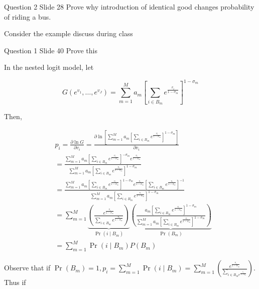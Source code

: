 \documentclass{article}
\begin{document}
\begin{problem}{Question 2 Slide 28}
Prove why introduction of identical good changes probability of riding a bus.
\end{problem}
\begin{solution}
Consider the example discuss during class 
\end{solution}


\begin{problem}{Question 1 Slide 40}
Prove this
\end{problem}
\begin{solution}
In the nested logit model, let

\begin{equation*}
G\left(e^{v_{1}}, \ldots, e^{v_{J}}\right)=\sum_{m=1}^{M} a_{m}\left[\sum_{i \in B_{m}} e^{\frac{v_{i}}{1-\sigma_{m}}}\right]^{1-\sigma_{m}}
\end{equation*}

Then,

\begin{equation*}
\begin{aligned}
& p_{i}=\frac{\partial \ln G}{\partial v_{i}}=\frac{\partial \ln \left[\sum_{m=1}^{M} a_{m}\left[\sum_{i \in B_{m}} e^{\frac{v_{i}}{1-\sigma_{m}}}\right]^{1-\sigma_{m}}\right]}{\partial v_{i}} \\
& =\frac{\sum_{m=1}^{M} a_{m}\left[\sum_{i \in B_{m}} e^{\frac{v_{i}}{1-\sigma_{m}}}\right]^{-\sigma_{m}} e^{\frac{v_{i}}{1-\sigma_{m}}}}{\sum_{m=1}^{M} a_{m}\left[\sum_{i \in B_{m}} e^{\frac{v_{i}}{1-\sigma_{m}}}\right]^{1-\sigma_{m}}} \\
& =\frac{\sum_{m=1}^{M} a_{m}\left[\sum_{i \in B_{m}} e^{\frac{v_{i}}{1-\sigma_{m}}}\right]^{1-\sigma_{m}} e^{\frac{v_{i}}{1-\sigma_{m}}}\left[\sum_{i \in B_{m}} e^{\frac{v_{i}}{1-\sigma_{m}}}\right]^{-1}}{\sum_{m=1}^{M} a_{m}\left[\sum_{i \in B_{m}} e^{\frac{v_{i}}{1-\sigma_{m}}}\right]^{1-\sigma_{m}}} \\
& =\sum_{m=1}^{M} \underbrace{\left(\frac{e^{\frac{v_{i}}{1-\sigma_{m}}}}{\sum_{i \in B_{m}} e^{\frac{v_{i}}{1-\sigma_{m}}}}\right)}_{\Pr\left(i \mid B_{m}\right)} \underbrace{\left(\frac{a_{m}\left[\sum_{i \in B_{m}} e^{\frac{v_{i}}{1-\sigma_{m}}}\right]^{1-\sigma_{m}}}{\sum_{m=1}^{M} a_{m}\left[\sum_{i \in B_{m}} e^{\frac{v_{i}}{1-\sigma_{m}}}\right]^{1-\sigma_{m}}}\right)}_{\Pr\left(B_{m}\right)} \\
& =\sum_{m=1}^{M} \Pr\left(i \mid B_{m}\right) P\left(B_{m}\right)
\end{aligned}
\end{equation*}

Observe that if $\Pr\left(B_{m}\right)=1, p_{i}=\sum_{m=1}^{M} \Pr\left(i \mid B_{m}\right)=\sum_{m=1}^{M}\left(\frac{e^{\frac{v_{i}}{1-\sigma_{m}}}}{\sum_{i \in B_{m} e^{\frac{v_{i}}{1-\sigma_{m}}}}}\right)$. Thus if 
\end{solution}
\end{document}
